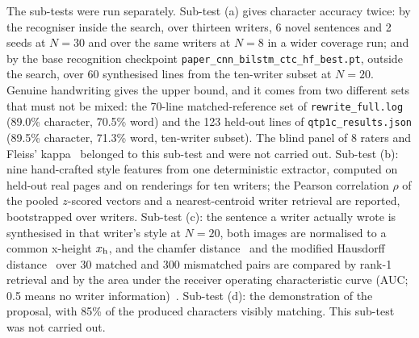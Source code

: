 
            The sub-tests were run separately.
            Sub-test (a) gives character accuracy twice: by the recogniser inside the search, over thirteen writers, 6 novel sentences and 2 seeds at $N=30$ and over the same writers at $N=8$ in a wider coverage run; and by the base recognition checkpoint \texttt{paper\_cnn\_bilstm\_ctc\_hf\_best.pt}, outside the search, over 60 synthesised lines from the ten-writer subset at $N=20$. Genuine handwriting gives the upper bound, and it comes from two different sets that must not be mixed: the 70-line matched-reference set of \texttt{rewrite\_full.log} (89.0\% character, 70.5\% word) and the 123 held-out lines of \texttt{qtp1c\_results.json} (89.5\% character, 71.3\% word, ten-writer subset). The blind panel of 8 raters and Fleiss' kappa~\cite{fleiss1971} belonged to this sub-test and were not carried out.
            Sub-test (b): nine hand-crafted style features from one deterministic extractor, computed on held-out real pages and on renderings for ten writers; the Pearson correlation $\rho$ of the pooled $z$-scored vectors and a nearest-centroid writer retrieval are reported, bootstrapped over writers.
            Sub-test (c): the sentence a writer actually wrote is synthesised in that writer's style at $N=20$, both images are normalised to a common x-height $x_{\mathrm{h}}$, and the chamfer distance~\cite{barrow1977}  and the modified Hausdorff distance~\cite{dubuisson1994} over 30 matched and 300 mismatched pairs are compared by rank-1 retrieval and by the area under the receiver operating characteristic curve (AUC; 0.5 means no writer information)~\cite{fawcett2006}.
            Sub-test (d): the demonstration of the proposal, with 85\% of the produced characters visibly matching. This sub-test was not carried out.

